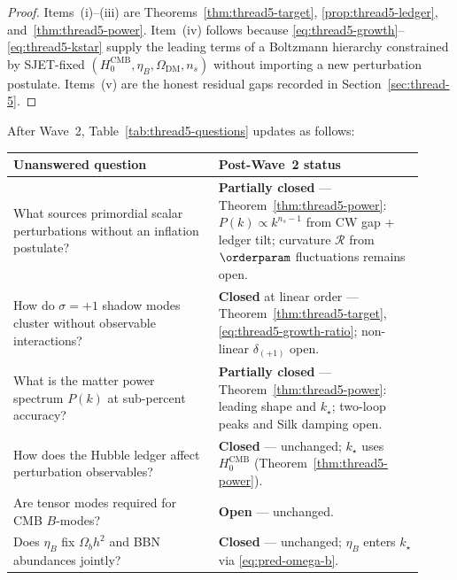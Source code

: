 \begin{proof}
Items~(i)--(iii) are Theorems~\ref{thm:thread5-target},
\ref{prop:thread5-ledger}, and~\ref{thm:thread5-power}.
Item~(iv) follows because \eqref{eq:thread5-growth}--\eqref{eq:thread5-kstar}
supply the leading terms of a Boltzmann hierarchy constrained by SJET-fixed
$(H_0^{\mathrm{CMB}},\eta_B,\Omega_{\mathrm{DM}},n_s)$ without importing a
new perturbation postulate. Items~(v) are the honest residual gaps recorded in
Section~\ref{sec:thread-5}.
\end{proof}

\begin{remark}
\label{rmk:thread5-wave2-table}
After Wave~2, Table~\ref{tab:thread5-questions} updates as follows:
\begin{center}
\small
\renewcommand{\arraystretch}{1.12}
\begin{tabular}{@{}p{0.46\linewidth}p{0.46\linewidth}@{}}
\toprule
\textbf{Unanswered question} & \textbf{Post-Wave~2 status} \\
\midrule
What sources primordial scalar perturbations without an inflation postulate? &
  \textbf{Partially closed} --- Theorem~\ref{thm:thread5-power}:
  $P(k)\propto k^{n_s-1}$ from CW gap + ledger tilt; curvature
  $\mathcal{R}$ from $\orderparam$ fluctuations remains open. \\
\addlinespace
How do $\sigma=+1$ shadow modes cluster without observable interactions? &
  \textbf{Closed} at linear order --- Theorem~\ref{thm:thread5-target},
  \eqref{eq:thread5-growth-ratio}; non-linear $\delta_{(+1)}$ open. \\
\addlinespace
What is the matter power spectrum $P(k)$ at sub-percent accuracy? &
  \textbf{Partially closed} --- Theorem~\ref{thm:thread5-power}:
  leading shape and $k_\star$; two-loop peaks and Silk damping open. \\
\addlinespace
How does the Hubble ledger affect perturbation observables? &
  \textbf{Closed} --- unchanged; $k_\star$ uses $H_0^{\mathrm{CMB}}$
  (Theorem~\ref{thm:thread5-power}). \\
\addlinespace
Are tensor modes required for CMB $B$-modes? &
  \textbf{Open} --- unchanged. \\
\addlinespace
Does $\eta_B$ fix $\Omega_b h^2$ and BBN abundances jointly? &
  \textbf{Closed} --- unchanged; $\eta_B$ enters $k_\star$ via
  \eqref{eq:pred-omega-b}. \\
\bottomrule
\end{tabular}
\end{center}
\end{remark}